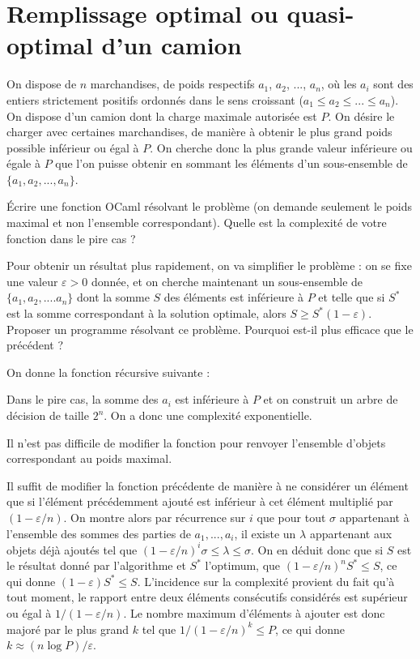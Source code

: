 \renewcommand{\SourceFile}{3-strategies-gloutonnes/src/3-3.ml}

\section{Remplissage optimal ou quasi-optimal d'un camion}

On dispose de $n$ marchandises, de poids respectifs $a_1$, $a_2$, ..., $a_n$, où les $a_i$ sont des entiers strictement positifs ordonnés dans le sens croissant ($a_1 \leq a_2 \leq ... \leq a_n$). On dispose d'un camion dont la charge maximale autorisée est $P$. On désire le charger avec certaines marchandises, de manière à obtenir le plus grand poids possible inférieur ou égal à $P$. On cherche donc la plus grande valeur inférieure ou égale à $P$ que l'on puisse obtenir en sommant les éléments d'un sous-ensemble de $\{a_1,a_2,...,a_n\}$.

\Q
Écrire une fonction OCaml résolvant le problème (on demande seulement le poids maximal et non l'ensemble correspondant). Quelle est la complexité de votre fonction dans le pire cas ?

\Q
Pour obtenir un résultat plus rapidement, on va simplifier le problème : on se fixe une valeur $\varepsilon>0$ donnée, et on cherche maintenant un sous-ensemble de $\{a_1,a_2,....a_n\}$ dont la somme $S$ des éléments est inférieure à $P$ et telle que si $S^*$ est la somme correspondant à la solution optimale, alors $S\geq S^*(1-\varepsilon)$. Proposer un programme résolvant ce problème. Pourquoi est-il plus efficace que le précédent ?

\Corrige

\Q
On donne la fonction récursive suivante :



Dans le pire cas, la somme des $a_i$ est inférieure à $P$ et on construit un arbre de décision de taille $2^n$. On a donc une complexité exponentielle.
\smallskip

Il n'est pas difficile de modifier la fonction pour renvoyer l'ensemble d'objets correspondant au poids maximal.

\Q
Il suffit de modifier la fonction précédente de manière à ne considérer un élément que si l'élément précédemment ajouté est inférieur à cet élément multiplié par $(1-\varepsilon/n)$. On montre alors par récurrence sur $i$ que pour tout $\sigma$ appartenant à l'ensemble des sommes des parties de $a_1,...,a_i$, il existe un $\lambda$ appartenant aux objets déjà ajoutés tel que $(1-\varepsilon/n)^i\sigma \leq \lambda \leq \sigma$. On en déduit donc que si $S$ est le résultat donné par l'algorithme et $S^*$ l'optimum, que $(1-\varepsilon/n)^nS^* \leq S$, ce qui donne $(1-\varepsilon)S^* \leq S$. L'incidence sur la complexité provient du fait qu'à tout moment, le rapport entre deux éléments consécutifs considérés est supérieur ou égal à $1/(1-\varepsilon/n)$. Le nombre maximum d'éléments à ajouter est donc majoré par le plus grand $k$ tel que $1/(1-\varepsilon/n)^k \leq P$, ce qui donne $k \approx (n\log P)/\varepsilon$.
\bigskip

\Fin

